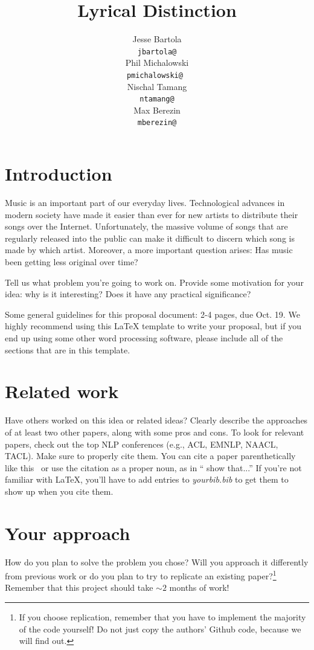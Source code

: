 \documentclass[11pt,a4paper]{article}
\title{Lyrical Distinction}
\author{Jesse Bartola \\
  {\tt jbartola@} \\\And
  Phil Michalowski \\
  {\tt pmichalowski@ } \\\And
  Nischal Tamang \\
  {\tt ntamang@} \\\And
  Max Berezin \\
  {\tt mberezin@} \\}
\date{}
\begin{document}
\maketitle

\section{Introduction}
Music is an important part of our everyday lives. Technological advances in modern society have made it easier than ever for new artists to distribute their songs over the Internet. Unfortunately, the massive volume of songs that are regularly released into the public can make it difficult to discern which song is made by which artist. Moreover, a more important question arises: Has music been getting less original over time?



Tell us what problem you're going to work on. Provide some motivation for your idea: why is it interesting? Does it have any practical significance? 

Some general guidelines for this proposal document: 2-4 pages, due Oct. 19. We highly recommend using this LaTeX template to write your proposal, but if you end up using some other word processing software, please include all of the sections that are in this template.

\section{Related work}
Have others worked on this idea or related ideas? Clearly describe the approaches of at least two other papers, along with some pros and cons. To look for relevant papers, check out the top NLP conferences (e.g., ACL, EMNLP, NAACL, TACL). Make sure to properly cite them. You can cite a paper parenthetically like this~\cite{andrew2007scalable} or use the citation as a proper noun, as in `` show that...'' If you're not familiar with LaTeX, you'll have to add entries to \emph{yourbib.bib} to get them to show up when you cite them. 

\section{Your approach}
How do you plan to solve the problem you chose? Will you approach it differently from previous work or do you plan to try to replicate an existing paper?\footnote{If you choose replication, remember that you have to implement the majority of the code yourself! Do not just copy the authors' Github code, because we will find out.} Remember that this project should take $\sim 2$ months of work!
\end{document}
